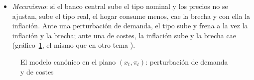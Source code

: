\documentclass[11pt]{article}
\begin{document}
\begin{infografia}[H]
\centering
\caption{Las 3~ecuaciones del modelo neokeynesiano}\label{figu:nek-esquema}
\end{infografia}

\begin{itemize}
\item \emph{Mecanismo}: si el banco central sube el tipo nominal y los precios no se ajustan, sube el tipo real, el hogar consume menos, cae la brecha y con ella la inflación. Ante una perturbación de demanda, el tipo sube y frena a la vez la inflación y la brecha; ante una de costes, la inflación sube y la brecha cae (gráfico~\ref{fig:nek-xpi}, el mismo que en otro tema ).
\end{itemize}

\begin{figure}[H]
\centering
\caption{El modelo canónico en el plano $(x_t,\pi_t)$: perturbación de demanda y de costes}\label{fig:nek-xpi}
\end{figure}
\end{document}
